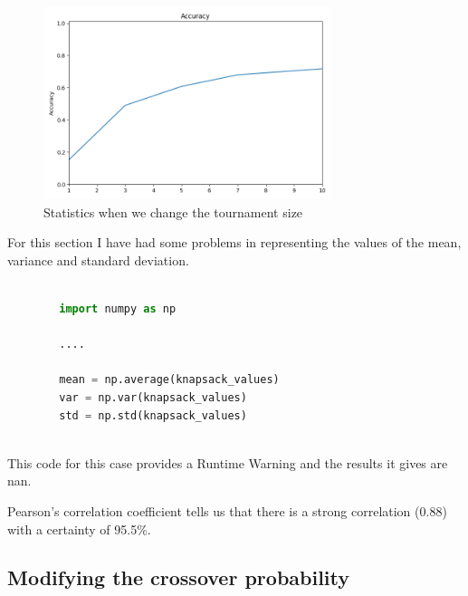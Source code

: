 \documentclass{article}
\begin{document}
    \begin{figure}[H]

        \centering
        \includegraphics[width=0.75\textwidth]{../media/ej1/03.TournamentSize_behaviour.png}
        \caption{Statistics when we change the tournament size}
        \label{Statistics when we change the tournament size}

    \end{figure}

    For this section I have had some problems in representing the values of the mean, variance and standard deviation.

    \begin{lstlisting}[language=Python]
        
        import numpy as np
        
        ....

        mean = np.average(knapsack_values)
        var = np.var(knapsack_values)
        std = np.std(knapsack_values)    
        
    \end{lstlisting}

    This code for this case provides a Runtime Warning and the results it gives are nan.

    Pearson's correlation coefficient tells us that there is a strong correlation (0.88) with a certainty of 95.5\%.

    \subsection*{Modifying the crossover probability}
\end{document}

